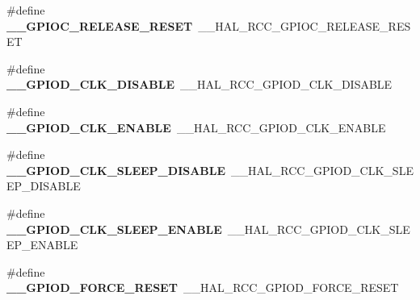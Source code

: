 \begin{DoxyCompactItemize}
\item 
\#define {\bfseries \+\_\+\+\_\+\+G\+P\+I\+O\+C\+\_\+\+R\+E\+L\+E\+A\+S\+E\+\_\+\+R\+E\+S\+ET}~\+\_\+\+\_\+\+H\+A\+L\+\_\+\+R\+C\+C\+\_\+\+G\+P\+I\+O\+C\+\_\+\+R\+E\+L\+E\+A\+S\+E\+\_\+\+R\+E\+S\+ET\hypertarget{group___h_a_l___r_c_c___aliased_ga12465c6f9d1cd0fc2d3a8d61298c6da2}{}\label{group___h_a_l___r_c_c___aliased_ga12465c6f9d1cd0fc2d3a8d61298c6da2}

\item 
\#define {\bfseries \+\_\+\+\_\+\+G\+P\+I\+O\+D\+\_\+\+C\+L\+K\+\_\+\+D\+I\+S\+A\+B\+LE}~\+\_\+\+\_\+\+H\+A\+L\+\_\+\+R\+C\+C\+\_\+\+G\+P\+I\+O\+D\+\_\+\+C\+L\+K\+\_\+\+D\+I\+S\+A\+B\+LE\hypertarget{group___h_a_l___r_c_c___aliased_ga547bef54b61ffc8c9aabe04ace7bfa4d}{}\label{group___h_a_l___r_c_c___aliased_ga547bef54b61ffc8c9aabe04ace7bfa4d}

\item 
\#define {\bfseries \+\_\+\+\_\+\+G\+P\+I\+O\+D\+\_\+\+C\+L\+K\+\_\+\+E\+N\+A\+B\+LE}~\+\_\+\+\_\+\+H\+A\+L\+\_\+\+R\+C\+C\+\_\+\+G\+P\+I\+O\+D\+\_\+\+C\+L\+K\+\_\+\+E\+N\+A\+B\+LE\hypertarget{group___h_a_l___r_c_c___aliased_ga090d866663d7c82b7550745653e766e9}{}\label{group___h_a_l___r_c_c___aliased_ga090d866663d7c82b7550745653e766e9}

\item 
\#define {\bfseries \+\_\+\+\_\+\+G\+P\+I\+O\+D\+\_\+\+C\+L\+K\+\_\+\+S\+L\+E\+E\+P\+\_\+\+D\+I\+S\+A\+B\+LE}~\+\_\+\+\_\+\+H\+A\+L\+\_\+\+R\+C\+C\+\_\+\+G\+P\+I\+O\+D\+\_\+\+C\+L\+K\+\_\+\+S\+L\+E\+E\+P\+\_\+\+D\+I\+S\+A\+B\+LE\hypertarget{group___h_a_l___r_c_c___aliased_gaecd23b9cf109d1002f2d85891f2885fa}{}\label{group___h_a_l___r_c_c___aliased_gaecd23b9cf109d1002f2d85891f2885fa}

\item 
\#define {\bfseries \+\_\+\+\_\+\+G\+P\+I\+O\+D\+\_\+\+C\+L\+K\+\_\+\+S\+L\+E\+E\+P\+\_\+\+E\+N\+A\+B\+LE}~\+\_\+\+\_\+\+H\+A\+L\+\_\+\+R\+C\+C\+\_\+\+G\+P\+I\+O\+D\+\_\+\+C\+L\+K\+\_\+\+S\+L\+E\+E\+P\+\_\+\+E\+N\+A\+B\+LE\hypertarget{group___h_a_l___r_c_c___aliased_gab48888fe0fccfe2c3343571878163026}{}\label{group___h_a_l___r_c_c___aliased_gab48888fe0fccfe2c3343571878163026}

\item 
\#define {\bfseries \+\_\+\+\_\+\+G\+P\+I\+O\+D\+\_\+\+F\+O\+R\+C\+E\+\_\+\+R\+E\+S\+ET}~\+\_\+\+\_\+\+H\+A\+L\+\_\+\+R\+C\+C\+\_\+\+G\+P\+I\+O\+D\+\_\+\+F\+O\+R\+C\+E\+\_\+\+R\+E\+S\+ET\hypertarget{group___h_a_l___r_c_c___aliased_ga505e70975bc0901549f467aa9a606bfa}{}\label{group___h_a_l___r_c_c___aliased_ga505e70975bc0901549f467aa9a606bfa}


\end{DoxyCompactItemize}
